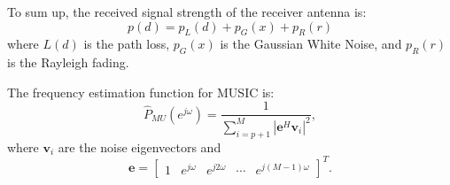 To sum up, the received signal strength of the receiver antenna is:
\begin{equation}
p(d)=p_{L}(d)+p_{G}(x)+p_{R}(r)
\end{equation}
where $L(d)$ is the path loss, $p_{G}(x)$ is the Gaussian White Noise, and $p_{R}(r)$ is the Rayleigh fading.
\vspace{1cm}


The frequency estimation function for MUSIC is:
\begin{equation}
\hat P_{MU}(e^{j \omega}) = \frac{1}{\sum_{i=p+1}^{M} |\mathbf{e}^{H} \mathbf{v}_i|^2},
\end{equation}
where $\mathbf{v}_i$ are the noise eigenvectors and
\begin{equation}
\mathbf{e} = \begin{bmatrix}1 & e^{j \omega} & e^{j 2 \omega} & \cdots & e^{j (M-1) \omega}\end{bmatrix}^T.
\end{equation}
